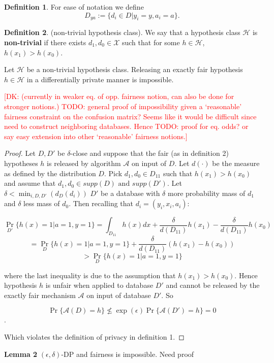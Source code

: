 \documentclass[format = sigconf]{acmart}
\newcommand{\dk}[1]{\textcolor{red}{[DK: #1]}}
\newcommand{\A}{\mathcal{A}}
\renewcommand{\H}{\mathcal{H}}
\newcommand{\1}{\mathbbm{1}}
\newcommand{\del}{\delta}
\newcommand{\eps}{\epsilon}
\theoremstyle{definition}
\newtheorem{defn}{Definition}[section]
\begin{document}
\begin{defn}
	For ease of notation we define
	$$D_{ya} := \{d_i \in D | y_i = y, a_i = a \}.$$
\end{defn}
\begin{defn}
	(non-trivial hypothesis class). We say that a hypothesis class $\H$ is {\bf non-trivial} if there exists $d_1, d_0 \in \mathcal{X}$ such that for some $h \in \H$, $h(x_1) > h(x_0)$.
\end{defn}
\begin{lemma}Let $\mathcal{H}$ be a non-trivial hypothesis class. Releasing an exactly fair hypothesis $h\in \mathcal{H}$ in a differentially private manner is impossible.
\end{lemma}
\dk{ (currently in weaker eq. of opp. fairness notion, can also be done for stronger notions.) TODO: general proof of impossibility given a `reasonable' fairness constraint on the confusion matrix? Seems like it would be difficult since need to construct neighboring databases. Hence TODO: proof for eq. odds? or say easy extension into other `reasonable' fairness notions.}

\begin{proof}
	Let $D, D'$ be $\del$-close and suppose that the fair (as in definition 2) hypotheses $h$ is released by algorithm $\mathcal{A}$ on input of $D$. Let $d(\cdot)$ be the measure as defined by the distribution $D$. Pick $d_1, d_0 \in D_{11}$ such that $h(x_1) > h(x_0)$ and assume that $d_1, d_0 \in supp(D) \text{ and } supp(D')$. Let $\del < \min_{i,D,D'}(d_{D}(d_i))$ $D'$ be a database with $\del$ more probability mass of $d_1$ and $\del$ less mass of $d_0$. Then recalling that $d_i = (y_i, x_i, a_i)$:

$$\Pr_{D'}\{h(x) = 1 | a = 1, y=1\} = \int_{D_{11}}h(x)dx + \frac{\del}{d(D_{11})} h(x_1) - \frac{\del}{d(D_{11})} h(x_0) $$
$$= \Pr_{D}\{h(x) = 1 | a = 1, y=1\} + \frac{\del}{d(D_{11})} (h(x_1) - h(x_0))$$
$$>  \Pr_{D}\{h(x) = 1 | a = 1, y=1\}$$

where the last inequality is due to the assumption that $h(x_1) > h(x_0)$. Hence hypothesis $h$ is unfair when applied to database $D'$ and cannot be released by the exactly fair mechanism $\A$ on input of database $D'$. So

$$\Pr\{\mathcal{A}(D) = h\} \not\leq \exp(\eps)\Pr\{\mathcal{A}(D') = h\} = 0$$.

Which violates the definition of privacy in definition 1.
\end{proof}

{\bf Lemma 2} $(\eps, \del)$-DP and fairness is impossible. Need proof
\end{document}
